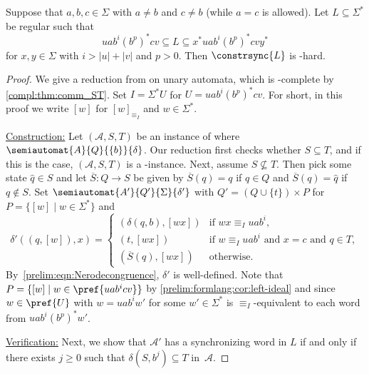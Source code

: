 \begin{proposition} \label{constrsync:letterbounded:lem:NPhard}
	Suppose that $a, b, c \in \Sigma$ with $a \ne b$ and $c \ne b$ (while $a = c$ is allowed). 
	Let $L \subseteq \Sigma^*$ be regular such that
	\[
	uab^i(b^p)^*cv
	\subseteq
	L
	\subseteq 
	x^* uab^i(b^p)^*cv y^*
	\]
	for $x, y \in \Sigma$
	with $i > |u| + |v|$ and $p > 0$.
	Then $\constrsync{L}$ is \NP-hard.
\end{proposition} %
\begin{proof}
	We give a reduction from \ST on unary automata,
	which is \NP-complete by \cref{compl:thm:comm_ST}.
	Set $I = \Sigma^* U$ for $U = uab^i(b^p)^*cv$.
	For short, in this proof we write $[w]$ for $[w]_{\equiv_I}$ and $w \in \Sigma^*$.
	
	\noindent\underline{Construction:} 
	Let $(\mathcal A, S, T)$ be an instance of \ST 
	where $\semiautomat{A}{Q}{\{b\}}{\delta}$.
	Our reduction first checks whether $S \subseteq T$,
	and if this is the case, $(\mathcal A, S, T)$
	is a \rYES-instance.
	Next, assume $S \not\subseteq T$.	
	Then pick some state $\hat q \in S$
	and let $\overline S \colon Q \to S$
	be given by $\overline{S}(q) = q$ if $q \in Q$
	and $\overline{S}(q) = \hat{q}$ if $q \notin S$.	
	Set $\semiautomat{A'}{Q'}{\Sigma}{\delta'}$
	with $Q' = (Q \cup \{t\}) \times P$ for $P = \{ [w] \mid w \in \Sigma^* \}$ and
	\[
	\delta'((q, [w]), x)
	=
	\begin{cases}
		(\delta(q, b), [wx]) & \text{if } wx \equiv_I uab^i, \\ %
		(t, [wx])            & \text{if } w  \equiv_I uab^i \text{ and } x = c \text{ and } q \in T, \\
		(\overline{S}(q), [wx])	& \text{otherwise.}
	\end{cases}
	\]
	By~\cref{prelim:eqn:Nerodecongruence}, $\delta'$ is well-defined.
	Note that $P = \{ [w] \mid w \in \pref{uab^icv} \}$
	by \cref{prelim:formlang:cor:left-ideal}
	and since $w \in \pref{U}$ with $w = uab^i w'$ for some $w' \in \Sigma^*$
	is $\equiv_I$-equivalent to each word from $uab^i (b^p)^*w'$.	
		
	\noindent\underline{Verification:} Next, we show that $\mathcal A'$
	has a synchronizing word in $L$ if and only if
	there exists $j \ge 0$ such that $\delta(S, b^j) \subseteq T$
	in~$\mathcal A$.
	

\end{proof}
